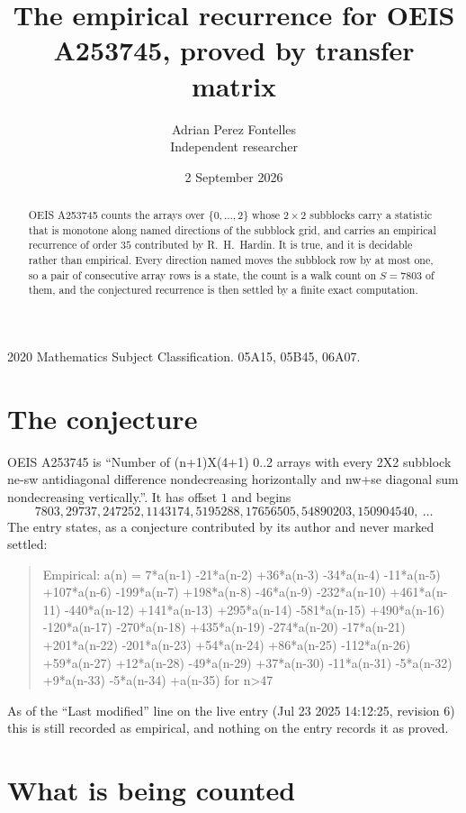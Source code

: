 \documentclass[11pt,a4paper]{article}
\title{The empirical recurrence for OEIS A253745, proved by transfer matrix}
\author{Adrian Perez Fontelles\\ \small Independent researcher}
\date{2 September 2026}
\theoremstyle{plain}
\theoremstyle{definition}
\begin{document}
\maketitle

\begin{abstract}
OEIS A253745 counts the arrays over $\{0,\dots,2\}$ whose $2\times2$ subblocks carry a
statistic that is monotone along named directions of the subblock grid, and carries an
empirical recurrence of order $35$ contributed by R.~H.~Hardin. It is true, and it is
decidable rather than empirical. Every direction named moves the subblock row by at most one,
so a pair of consecutive array rows is a state, the count is a walk count on $S=7803$ of them,
and the conjectured recurrence is then settled by a finite exact computation.
\end{abstract}

\noindent\small 2020 Mathematics Subject Classification. 05A15, 05B45, 06A07.\normalsize

\section{The conjecture}

OEIS A253745 is ``Number of (n+1)X(4+1) 0..2 arrays with every 2X2 subblock ne-sw antidiagonal difference nondecreasing horizontally and nw+se diagonal sum nondecreasing vertically.''. It has offset $1$ and begins
\[
7803, 29737, 247252, 1143174, 5195288, 17656505, 54890203, 150904540,\ \dots
\]
The entry states, as a conjecture contributed by its author and never marked settled:
\begin{quote}
Empirical: a(n) = 7*a(n-1) -21*a(n-2) +36*a(n-3) -34*a(n-4) -11*a(n-5) +107*a(n-6) -199*a(n-7) +198*a(n-8) -46*a(n-9) -232*a(n-10) +461*a(n-11) -440*a(n-12) +141*a(n-13) +295*a(n-14) -581*a(n-15) +490*a(n-16) -120*a(n-17) -270*a(n-18) +435*a(n-19) -274*a(n-20) -17*a(n-21) +201*a(n-22) -201*a(n-23) +54*a(n-24) +86*a(n-25) -112*a(n-26) +59*a(n-27) +12*a(n-28) -49*a(n-29) +37*a(n-30) -11*a(n-31) -5*a(n-32) +9*a(n-33) -5*a(n-34) +a(n-35) for n>47
\end{quote}
As of the ``Last modified'' line on the live entry (Jul 23 2025 14:12:25, revision 6) this is still
recorded as empirical, and nothing on the entry records it as proved.

\section{What is being counted}
\end{document}
